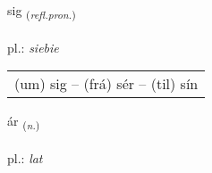 \documentclass[frontgrid, backgrid]{flacards}\usepackage[]{graphicx}\usepackage[]{xcolor}
\begin{document}
\renewcommand{\blhead}{\vskip5pt {\small\bfseries\footnotesize Fornafn | Pronoun }}
\renewcommand{\bcfoot}{\vskip5pt \hspace{2pt}{\small\bfseries\footnotesize 1K}}


{sig \small{\textsubscript{(\textit{refl.pron.})}} \\[1ex] %
\textphonetic{[sɪːɣ]} \\
pl.: \emph{siebie} \\  [2ex]
\renewcommand*{\arraystretch}{0.8}
\begin{tabular}{l}
(um) sig -- (frá) sér -- (til) sín \\ 
\end{tabular}
}

\renewcommand{\flhead}{\vskip5pt \fboxsep=0pt {\small\bfseries\footnotesize Nafnorð | Noun}}
\renewcommand{\fcfoot}{\vskip5pt \fboxsep=0pt \hspace{2pt}{\small\bfseries\footnotesize 1K}}

\renewcommand{\blhead}{\vskip5pt {\small\bfseries\footnotesize Nafnorð | Noun }}
\renewcommand{\bcfoot}{\vskip5pt \hspace{2pt}{\small\bfseries\footnotesize 1K}}


{ár \small{\textsubscript{(\textit{n.})}} \\[1ex] %
\textphonetic{[auːr]} \\
pl.: \emph{lat} \\  [2ex]
\renewcommand*{\arraystretch}{0.8}
}

\renewcommand{\flhead}{\vskip5pt \fboxsep=0pt {\small\bfseries\footnotesize Fornafn | Pronoun}}
\renewcommand{\fcfoot}{\vskip5pt \fboxsep=0pt \hspace{2pt}{\small\bfseries\footnotesize 1K}}
\end{document}
